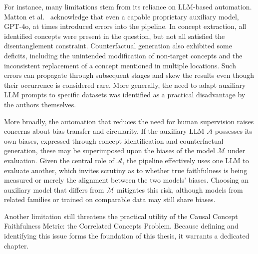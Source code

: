 For instance, many limitations stem from its reliance on LLM-based automation. Matton et al.~\cite{mattonWalkTalkMeasuring2024} acknowledge that even a capable proprietary auxiliary model, GPT-4o, at times introduced errors into the pipeline. In concept extraction, all identified concepts were present in the question, but not all satisfied the disentanglement constraint. Counterfactual generation also exhibited some deficits, including the unintended modification of non-target concepts and the inconsistent replacement of a concept mentioned in multiple locations. Such errors can propagate through subsequent stages and skew the results even though their occurrence is considered rare. More generally, the need to adapt auxiliary LLM prompts to specific datasets was identified as a practical disadvantage by the authors themselves.

More broadly, the automation that reduces the need for human supervision raises concerns about bias transfer and circularity. If the auxiliary LLM $\mathcal{A}$ possesses its own biases, expressed through concept identification and counterfactual generation, these may be superimposed upon the biases of the model $\mathcal{M}$ under evaluation. Given the central role of $\mathcal{A}$, the pipeline effectively uses one LLM to evaluate another, which invites scrutiny as to whether true faithfulness is being measured or merely the alignment between the two models' biases. Choosing an auxiliary model that differs from $\mathcal{M}$ mitigates this risk, although models from related families or trained on comparable data may still share biases.

Another limitation still threatens the practical utility of the Causal Concept Faithfulness Metric: the Correlated Concepts Problem. Because defining and identifying this issue forms the foundation of this thesis, it warrants a dedicated chapter.
